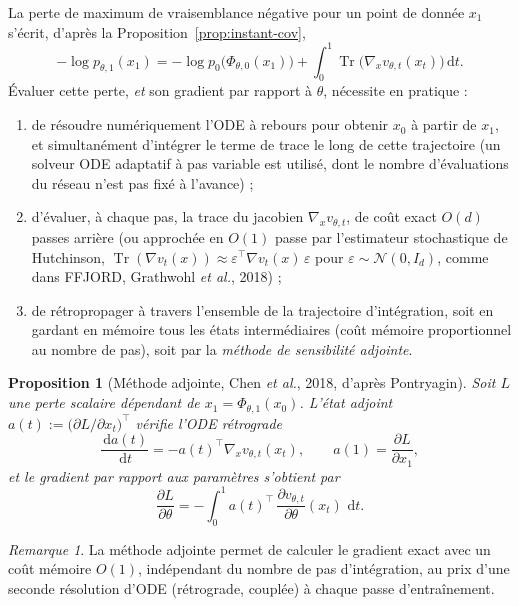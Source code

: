 \documentclass[11pt,a4paper]{article}
\theoremstyle{definition}
\theoremstyle{plain}
\newtheorem{proposition}{Proposition}[section]
\theoremstyle{remark}
\newtheorem{remark}{Remarque}[section]
\newcommand{\dd}{\,\mathrm{d}}
\DeclareMathOperator{\Tr}{Tr}
\begin{document}
La perte de maximum de vraisemblance négative pour un point de donnée
$x_1$ s'écrit, d'après la Proposition~\ref{prop:instant-cov},
\[
  -\log p_{\theta,1}(x_1)
  =
  -\log p_0\bigl(\Phi_{\theta,0}(x_1)\bigr) + \int_0^1 \Tr\bigl(\nabla_x v_{\theta,t}(x_t)\bigr)\dd t.
\]
Évaluer cette perte, \emph{et} son gradient par rapport à $\theta$, nécessite
en pratique :
\begin{enumerate}[leftmargin=*]
  \item de résoudre numériquement l'ODE à rebours pour obtenir $x_0$ à partir de
  $x_1$, et simultanément d'intégrer le terme de trace le long de cette
  trajectoire (un solveur ODE adaptatif à pas variable est utilisé, dont le
  nombre d'évaluations du réseau n'est pas fixé à l'avance) ;
  \item d'évaluer, à chaque pas, la trace du jacobien $\nabla_xv_{\theta,t}$,
  de coût exact $O(d)$ passes arrière (ou approchée en $O(1)$ passe par
  l'estimateur stochastique de Hutchinson,
  $\Tr(\nabla v_t(x))\approx \varepsilon^\top\nabla v_t(x)\,\varepsilon$ pour
  $\varepsilon\sim\mathcal{N}(0,I_d)$, comme dans FFJORD, Grathwohl \emph{et
  al.}, 2018) ;
  \item de rétropropager à travers l'ensemble de la trajectoire d'intégration,
  soit en gardant en mémoire tous les états intermédiaires (coût mémoire
  proportionnel au nombre de pas), soit par la \emph{méthode de sensibilité
  adjointe}.
\end{enumerate}

\begin{proposition}[Méthode adjointe, {Chen \emph{et al.}, 2018, d'après Pontryagin}]
Soit $L$ une perte scalaire dépendant de $x_1=\Phi_{\theta,1}(x_0)$. L'état
adjoint $a(t):=\bigl(\partial L/\partial x_t\bigr)^\top$ vérifie l'ODE rétrograde
\[
  \frac{\dd a(t)}{\dd t} = -a(t)^\top \nabla_x v_{\theta,t}(x_t),
  \qquad a(1) = \frac{\partial L}{\partial x_1},
\]
et le gradient par rapport aux paramètres s'obtient par
\[
  \frac{\partial L}{\partial \theta} = -\int_0^1 a(t)^\top\,\frac{\partial v_{\theta,t}}{\partial\theta}(x_t)\,\dd t.
\]
\end{proposition}

\begin{remark}
La méthode adjointe permet de calculer le gradient exact avec un coût mémoire
$O(1)$, indépendant du nombre de pas d'intégration, au prix d'une seconde
résolution d'ODE (rétrograde, couplée) à chaque passe d'entraînement.
\end{remark}
\end{document}

